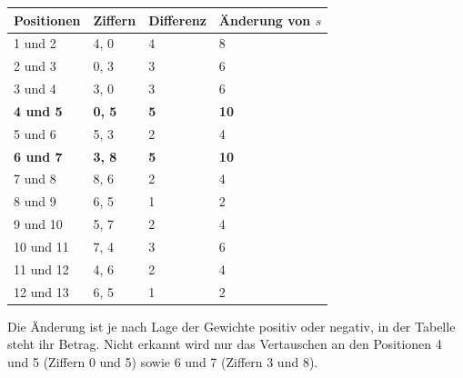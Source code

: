 \begin{myexercise}
\begin{myanswer}
\begin{aenum}
                  \begin{center}
                      \begin{tabular}{llll}
                          \textbf{Positionen} & \textbf{Ziffern} & \textbf{Differenz} & \textbf{Änderung von $s$} \\
                          \midrule
                          1 und 2             & 4, 0             & 4                  & 8                         \\
                          2 und 3             & 0, 3             & 3                  & 6                         \\
                          3 und 4             & 3, 0             & 3                  & 6                         \\
                          \textbf{4 und 5}    & \textbf{0, 5}    & \textbf{5}         & \textbf{10}               \\
                          5 und 6             & 5, 3             & 2                  & 4                         \\
                          \textbf{6 und 7}    & \textbf{3, 8}    & \textbf{5}         & \textbf{10}               \\
                          7 und 8             & 8, 6             & 2                  & 4                         \\
                          8 und 9             & 6, 5             & 1                  & 2                         \\
                          9 und 10            & 5, 7             & 2                  & 4                         \\
                          10 und 11           & 7, 4             & 3                  & 6                         \\
                          11 und 12           & 4, 6             & 2                  & 4                         \\
                          12 und 13           & 6, 5             & 1                  & 2                         \\
                      \end{tabular}
                  \end{center}
                  Die Änderung ist je nach Lage der Gewichte positiv oder negativ, in der Tabelle steht ihr Betrag. Nicht erkannt wird nur das Vertauschen an den Positionen 4 und 5 (Ziffern 0 und 5) sowie 6 und 7 (Ziffern 3 und 8).
        \end{aenum}
    \end{myanswer}

\end{myexercise}

